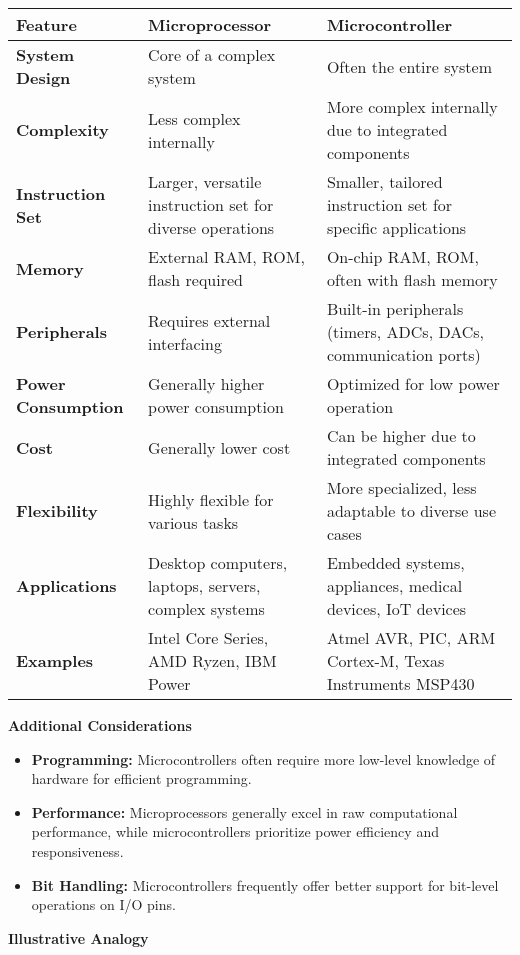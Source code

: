 \documentclass[
]{article}
\begin{document}
\begin{longtable}[]{@{}lll@{}}
\toprule
Feature & Microprocessor & Microcontroller \\
\midrule
\endhead
\textbf{System Design} & Core of a complex system & Often the entire
system \\
\textbf{Complexity} & Less complex internally & More complex internally
due to integrated components \\
\textbf{Instruction Set} & Larger, versatile instruction set for diverse
operations & Smaller, tailored instruction set for specific
applications \\
\textbf{Memory} & External RAM, ROM, flash required & On-chip RAM, ROM,
often with flash memory \\
\textbf{Peripherals} & Requires external interfacing & Built-in
peripherals (timers, ADCs, DACs, communication ports) \\
\textbf{Power Consumption} & Generally higher power consumption &
Optimized for low power operation \\
\textbf{Cost} & Generally lower cost & Can be higher due to integrated
components \\
\textbf{Flexibility} & Highly flexible for various tasks & More
specialized, less adaptable to diverse use cases \\
\textbf{Applications} & Desktop computers, laptops, servers, complex
systems & Embedded systems, appliances, medical devices, IoT devices \\
\textbf{Examples} & Intel Core Series, AMD Ryzen, IBM Power & Atmel AVR,
PIC, ARM Cortex-M, Texas Instruments MSP430 \\
\bottomrule
\end{longtable}

\textbf{Additional Considerations}

\begin{itemize}
\item
  \textbf{Programming:} Microcontrollers often require more low-level
  knowledge of hardware for efficient programming.
\item
  \textbf{Performance:} Microprocessors generally excel in raw
  computational performance, while microcontrollers prioritize power
  efficiency and responsiveness.
\item
  \textbf{Bit Handling:} Microcontrollers frequently offer better
  support for bit-level operations on I/O pins.
\end{itemize}

\textbf{Illustrative Analogy}
\end{document}

